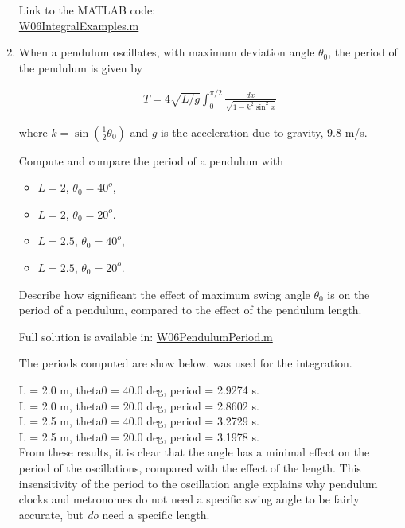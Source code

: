 \begin{enumerate}[1.]
\begin{Solution}
Link to the MATLAB code: \\
\href{http://www.mast.queensu.ca/~apsc171/MNTCP01/PracticeProblems/MATLAB/W06IntegralExamples.m}{W06IntegralExamples.m}
\end{Solution}


\item 
  \begin{Question}
    
When a pendulum oscillates, with maximum deviation angle
  $\theta_0$, the period of the pendulum is given by

\begin{align*}
  T = 4 \sqrt{L/g} \int_0^{\pi/2} \frac{dx}{\sqrt{1 - k^2 \sin^2 x}}
\end{align*}

where $k = \sin\left(\frac{1}{2} \theta_0\right)$ and $g$ is the
acceleration due to gravity, $9.8 $ m/s.

Compute and compare the period of a pendulum with 
\begin{itemize}
\item $L = 2$, $\theta_0 = 40^o$, 
\item $L =2$, $\theta_0 = 20^o$.
\item $L = 2.5$, $\theta_0 = 40^o$, 
\item $L =2.5$, $\theta_0 = 20^o$.
\end{itemize}

Describe how significant the effect of maximum swing angle $\theta_0$
is on the period of a pendulum, compared to the effect of the pendulum
length.
  \end{Question}

\begin{Solution} 
 Full solution is available in:
\href{http://www.mast.queensu.ca/~apsc171/MNTCP01/PracticeProblems/MATLAB/W06PendulumPeriod.m}{W06PendulumPeriod.m}

  The periods computed are show below.  \verb@integral@ was used for the
  integration.

L = 2.0 m, theta0 = 40.0 deg, period = 2.9274 s. \\
L = 2.0 m, theta0 = 20.0 deg, period = 2.8602 s. \\
L = 2.5 m, theta0 = 40.0 deg, period = 3.2729 s. \\
L = 2.5 m, theta0 = 20.0 deg, period = 3.1978 s. \\

From these results, it is clear that the angle has a minimal effect on
the period of the oscillations, compared with the effect of the
length.  This insensitivity of the period to the oscillation angle
explains why pendulum clocks and metronomes do not need a specific
swing angle to be fairly accurate, but {\em do} need a specific
length.
\end{Solution} 



\end{enumerate}

